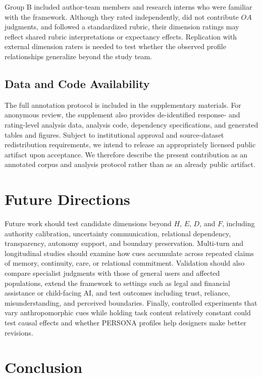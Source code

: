 \documentclass[manuscript,review,anonymous]{acmart}
\begin{document}
Group B included author-team members and research interns who were familiar with the framework. Although they rated independently, did not contribute $OA$ judgments, and followed a standardized rubric, their dimension ratings may reflect shared rubric interpretations or expectancy effects. Replication with external dimension raters is needed to test whether the observed profile relationships generalize beyond the study team.

\subsection{Data and Code Availability}

The full annotation protocol is included in the supplementary materials. For anonymous review, the supplement also provides de-identified response- and rating-level analysis data, analysis code, dependency specifications, and generated tables and figures. Subject to institutional approval and source-dataset redistribution requirements, we intend to release an appropriately licensed public artifact upon acceptance. We therefore describe the present contribution as an annotated corpus and analysis protocol rather than as an already public artifact.

\section{Future Directions}

Future work should test candidate dimensions beyond $H$, $E$, $D$, and $F$, including authority calibration, uncertainty communication, relational dependency, transparency, autonomy support, and boundary preservation. Multi-turn and longitudinal studies should examine how cues accumulate across repeated claims of memory, continuity, care, or relational commitment. Validation should also compare specialist judgments with those of general users and affected populations, extend the framework to settings such as legal and financial assistance or child-facing AI, and test outcomes including trust, reliance, misunderstanding, and perceived boundaries. Finally, controlled experiments that vary anthropomorphic cues while holding task content relatively constant could test causal effects and whether PERSONA profiles help designers make better revisions.

\section{Conclusion}
\end{document}
